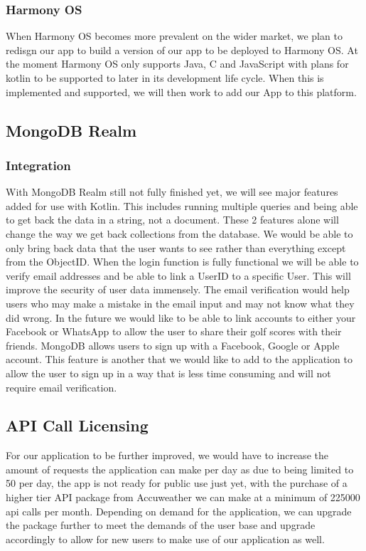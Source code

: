 \subsubsection{Harmony OS}
When Harmony OS becomes more prevalent on the wider market, we plan to redisgn our app to build a version of our app to be deployed to Harmony OS. At the moment Harmony OS only supports Java, C and JavaScript with plans for kotlin to be supported to later in its development life cycle. When this is implemented and supported, we will then work to add our App to this platform.
\newline
\subsection{MongoDB Realm}
\subsubsection{Integration}
With MongoDB Realm still not fully finished yet, we will see major features added for use with Kotlin. This includes running multiple queries and being able to get back the data in a string, not a document. These 2 features alone will change the way we get back collections from the database. We would be able to only bring back data that the user wants to see rather than everything except from the ObjectID. 
\newline
When the login function is fully functional we will be able to verify email addresses and be able to link a UserID to a specific User. This will improve the security of user data immensely. The email verification would help users who may make a mistake in the email input and may not know what they did wrong.
\newline
In the future we would like to be able to link accounts to either your Facebook or WhatsApp to allow the user to share their golf scores with their friends.
\newline
MongoDB allows users to sign up with a Facebook, Google or Apple account. This feature is another that we would like to add to the application to allow the user to sign up in a way that is less time consuming and will not require email verification.
\subsection{API Call Licensing}
For our application to be further improved, we would have to increase the amount of requests the application can make per day as due to being limited to 50 per day, the app is not ready for public use just yet, with the purchase of a higher tier API package from Accuweather we can make at a minimum of 225000 api calls per month. 
\newline
\newline
Depending on demand for the application, we can upgrade the package further to meet the demands of the user base and upgrade accordingly to allow for new users to make use of our application as well. 
